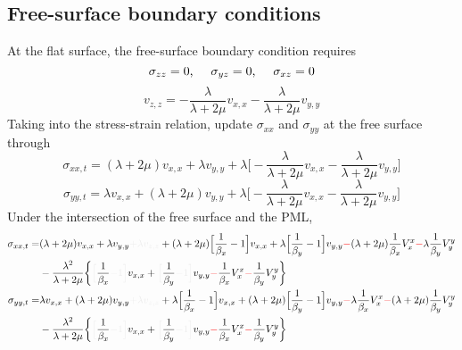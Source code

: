 \subsection{Free-surface boundary conditions}
At the flat surface, the free-surface boundary condition requires
\[ \sigma_{zz}=0 \text{,\hspace{5mm}} \sigma_{yz}=0 \text{,\hspace{5mm}} \sigma_{xz}=0 \]
\[ v_{z,z}=-\frac{\lambda}{\lambda+2\mu}v_{x,x}-\frac{\lambda}{\lambda+2\mu}v_{y,y} \]
Taking into the stress-strain relation, update $\sigma_{xx}$ and $\sigma_{yy}$ at the free surface through
\[ \sigma_{xx,t}=(\lambda+2\mu)v_{x,x}+\lambda v_{y,y}+\lambda\Big[-\frac{\lambda}{\lambda+2\mu}v_{x,x}-\frac{\lambda}{\lambda+2\mu}v_{y,y}\Big] \]
\[ \sigma_{yy,t}=\lambda v_{x,x}+(\lambda+2\mu)v_{y,y}+\lambda\Big[-\frac{\lambda}{\lambda+2\mu}v_{x,x}-\frac{\lambda}{\lambda+2\mu}v_{y,y}\Big] \]
Under the intersection of the free surface and the PML, 
\begin{align*}
  \sigma_{xx,t}= & (\lambda+2\mu)v_{x,x}+\lambda v_{y,y} \myde{+\lambda v_{z,z}} +(\lambda+2\mu)\Big[\frac{1}{\beta_x}-1\Big]v_{x,x}+\lambda\Big[\frac{1}{\beta_y}-1\Big]v_{y,y} \mynno{-} (\lambda+2\mu)\frac{1}{\beta_x}V_x^x \mynno{-} \lambda\frac{1}{\beta_y}V_y^y \\
    & -\frac{\lambda^2}{\lambda+2\mu}\bigg\{ \myde{\Big[} \frac{1}{\beta_x} \myde{-1\Big]} v_{x,x}+ \myde{\Big[} \frac{1}{\beta_y} \myde{-1\Big]} v_{y,y} \mynno{-} \frac{1}{\beta_x}V_x^x \mynno{-} \frac{1}{\beta_y}V_y^y\bigg\} \\
  \sigma_{yy,t}= & \lambda v_{x,x}+(\lambda+2\mu)v_{y,y} \myde{+\lambda v_{z,z}} +\lambda\Big[\frac{1}{\beta_x}-1\Big]v_{x,x}+(\lambda+2\mu)\Big[\frac{1}{\beta_y}-1\Big]v_{y,y} \mynno{-} \lambda\frac{1}{\beta_x}V_x^x \mynno{-} (\lambda+2\mu)\frac{1}{\beta_y}V_y^y \\
    & -\frac{\lambda^2}{\lambda+2\mu}\bigg\{ \myde{\Big[} \frac{1}{\beta_x} \myde{-1\Big]} v_{x,x}+ \myde{\Big[} \frac{1}{\beta_y} \myde{-1\Big]} v_{y,y} \mynno{-} \frac{1}{\beta_x}V_x^x \mynno{-} \frac{1}{\beta_y}V_y^y\bigg\} \\
\end{align*}
